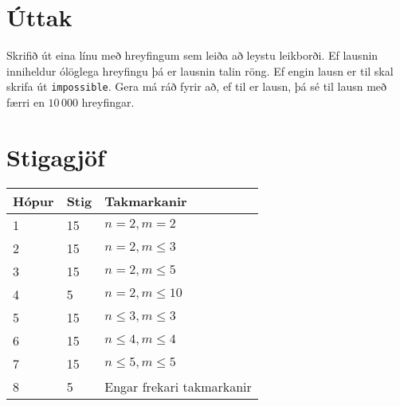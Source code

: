 \section*{Úttak}
Skrifið út eina línu með hreyfingum sem leiða að leystu leikborði.
Ef lausnin inniheldur ólöglega hreyfingu þá er lausnin talin röng.
Ef engin lausn er til skal skrifa út \texttt{impossible}.
Gera má ráð fyrir að, ef til er lausn, þá sé til lausn með færri en $10\,000$ hreyfingar.

\section*{Stigagjöf}
\begin{tabular}{|l|l|l|}
\hline
Hópur & Stig & Takmarkanir \\ \hline
1     & 15  & $n = 2, m = 2$\\ \hline
2     & 15  & $n = 2, m \leq 3$\\ \hline
3     & 15  & $n = 2, m \leq 5$\\ \hline
4     & 5  & $n = 2, m \leq 10$\\ \hline
5     & 15  & $n \leq 3, m \leq 3$\\ \hline
6     & 15  & $n \leq 4, m \leq 4$\\ \hline
7     & 15  & $n \leq 5, m \leq 5$\\ \hline
8     & 5  & Engar frekari takmarkanir\\ \hline
\end{tabular}

